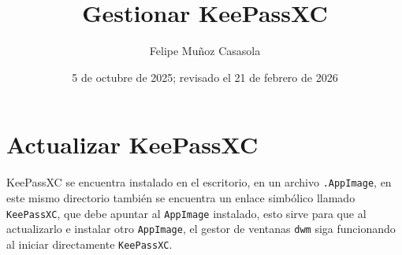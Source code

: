 \documentclass{article}
\title{Gestionar KeePassXC}
\author{Felipe Muñoz Casasola}
\date{5 de octubre de 2025; revisado el 21 de febrero de 2026}
\begin{document}
    \maketitle
    \clearpage
    \tableofcontents
    \clearpage
    
    \section{Actualizar KeePassXC}
    KeePassXC se encuentra instalado en el escritorio, en un archivo 
    \texttt{.AppImage}, en este mismo directorio también se encuentra un
    enlace simbólico llamado \texttt{KeePassXC}, que debe apuntar al
    \texttt{AppImage} instalado, esto sirve para que al actualizarlo
    e instalar otro \texttt{AppImage}, el gestor de ventanas \texttt{dwm}
    siga funcionando al iniciar directamente \texttt{KeePassXC}.
\end{document}
